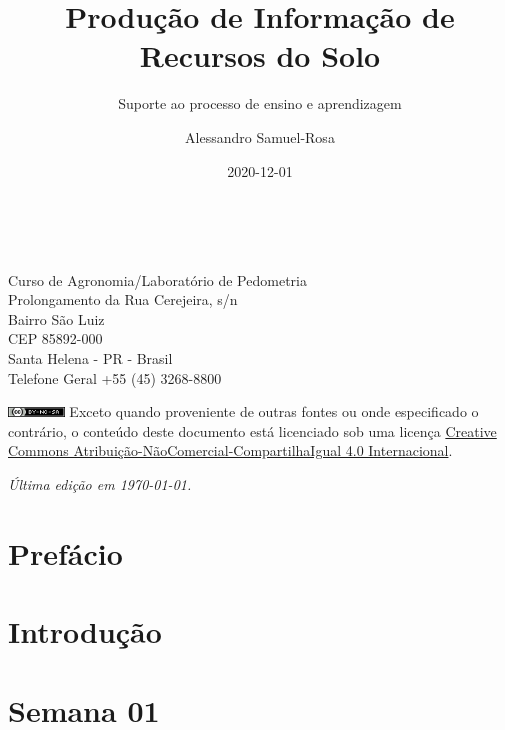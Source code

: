 \documentclass[
  11pt,
  a4paper,
  dvipsnames]{tufte-book}
\title{Produção de Informação de Recursos do Solo}
\subtitle{Suporte ao processo de ensino e aprendizagem}
\author{Alessandro Samuel-Rosa}
\date{2020-12-01}
\begin{document}
\maketitle

\newpage
\nopagecolor
\begin{fullwidth}
~\vfill
\thispagestyle{empty}
\setlength{\parindent}{0pt}
\setlength{\parskip}{\baselineskip}

\par{}

\par{Curso de Agronomia/Laboratório de Pedometria\\Prolongamento da Rua Cerejeira, s/n\\Bairro São Luiz\\CEP 85892-000\\Santa Helena - PR - Brasil\\Telefone Geral +55 (45) 3268-8800}

\par{}

\par\includegraphics[width=1.5cm]{img/cc-by-nc-sa.png} Exceto quando proveniente de outras fontes ou onde especificado o contrário, o conteúdo deste documento está licenciado sob uma licença \href{http://creativecommons.org/licenses/by-nc-sa/4.0/}{Creative Commons Atribuição-NãoComercial-CompartilhaIgual 4.0 Internacional}.

\par\textit{Última edição em \today.}
\end{fullwidth}

{
\hypersetup{linkcolor=}
\setcounter{tocdepth}{1}
\tableofcontents
}
\hypertarget{prefuxe1cio}{%
\chapter*{Prefácio}\label{prefuxe1cio}}

\hypertarget{introduuxe7uxe3o}{%
\chapter{Introdução}\label{introduuxe7uxe3o}}

\hypertarget{semana-01}{%
\chapter{Semana 01}\label{semana-01}}
\end{document}
